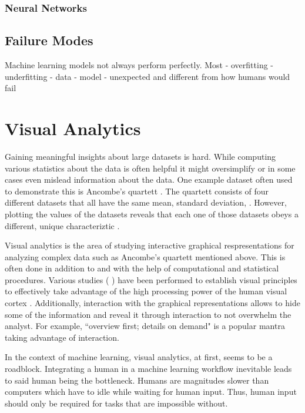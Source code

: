 \subsubsection{Neural Networks}

\subsection{Failure Modes}
Machine learning models not always perform perfectly.
Most \todo{}
- overfitting
- underfitting
- data
- model
- unexpected and different from how humans would fail

\section{Visual Analytics}
Gaining meaningful insights about large datasets is hard.
While computing various statistics about the data is often helpful it might oversimplify or in some cases even mislead information about the data.
One example dataset often used to demonstrate this is Ancombe's quartett .
The quartett consists of four different datasets that all have the same mean, standard deviation, .
However, plotting the values of the datasets reveals that each one of those datasets obeys a different, unique characteriztic .

Visual analytics is the area of studying interactive graphical respresentations for analyzing complex data such as Ancombe's quartett mentioned above.
This is often done in addition to and with the help of computational and statistical procedures.
Various studies (
) have been performed to establish visual principles to effectively take advantage of the high processing power of the human visual cortex .
Additionally, interaction with the graphical representations allows to hide some of the information and reveal it through interaction to not overwhelm the analyst.
For example, ``overview first; details on demand"  is a popular mantra taking advantage of interaction.

In the context of machine learning, visual analytics, at first, seems to be a roadblock.
Integrating a human in a machine learning workflow inevitable leads to said human being the bottleneck.
Humans are magnitudes slower than computers which have to idle while waiting for human input.
Thus, human input should only be required for tasks that are impossible without.

